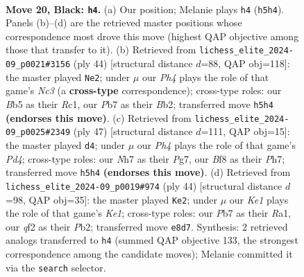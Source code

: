 \documentclass[11pt]{article}
\begin{document}
\begin{figure}[p]
\label{fig:thought-m37}
\end{figure}

\clearpage

\begin{figure}[p]\centering
\begin{subfigure}{0.46\textwidth}\centering
\resizebox{\linewidth}{!}{%
\newchessgame
\chessboard[
  setfen={4kb1r/1p2pp1n/1B1p2p1/1b5p/3PP3/rP2RP2/P4QPP/2K4R b k - 2 20},
  showmover=false,
  pgfstyle=straightmove, color=movearrow, markmove={h5-h4}
]}
\caption{}
\end{subfigure}\hfill
\begin{subfigure}{0.46\textwidth}\centering
\resizebox{\linewidth}{!}{%
\newchessgame
\chessboard[
  setfen={3rrqk1/p5pp/1p2p3/2p1Rp2/2P5/1PN5/PBB2PPP/2R3K1 w - - 0 23},
  showmover=false,
  pgfstyle=straightmove, color=movearrow, markmove={c3-e2}
]}
\caption{}
\end{subfigure}
\\[4pt]
\begin{subfigure}{0.46\textwidth}\centering
\resizebox{\linewidth}{!}{%
\newchessgame
\chessboard[
  setfen={r7/1p2kppp/1p2nb2/2pp4/P7/2P2PB1/1P3RPP/R5K1 b - - 2 24},
  showmover=false,
  pgfstyle=straightmove, color=movearrow, markmove={d5-d4}
]}
\caption{}
\end{subfigure}\hfill
\begin{subfigure}{0.46\textwidth}\centering
\resizebox{\linewidth}{!}{%
\newchessgame
\chessboard[
  setfen={r1b3R1/pp1k1p2/4pq1P/2p5/P2pP3/N2P4/1PPB3p/R3K3 w Q - 2 23},
  showmover=false,
  pgfstyle=straightmove, color=movearrow, markmove={e1-e2}
]}
\caption{}
\end{subfigure}
\caption{\textbf{Move 20, Black: \texttt{h4}.} (a) Our position; Melanie plays \texttt{h4} (\texttt{h5h4}). Panels (b)--(d) are the retrieved master positions whose correspondence most drove this move (highest QAP objective among those that transfer to it). (b) Retrieved from \texttt{lichess\_elite\_2024-09\_p0021\#3156} (ply 44) [structural distance $d$=88, QAP obj=118]: the master played \texttt{Ne2}; under $\mu$ our \emph{Ph4} plays the role of that game's \emph{Nc3} (a \textbf{cross-type} correspondence); cross-type roles: our \emph{B}b5 as their \emph{R}c1, our \emph{P}b7 as their \emph{B}b2; transferred move \texttt{h5h4} \textbf{(endorses this move)}. (c) Retrieved from \texttt{lichess\_elite\_2024-09\_p0025\#2349} (ply 47) [structural distance $d$=111, QAP obj=15]: the master played \texttt{d4}; under $\mu$ our \emph{Ph4} plays the role of that game's \emph{Pd4}; cross-type roles: our \emph{N}h7 as their \emph{P}g7, our \emph{B}f8 as their \emph{P}h7; transferred move \texttt{h5h4} \textbf{(endorses this move)}. (d) Retrieved from \texttt{lichess\_elite\_2024-09\_p0019\#974} (ply 44) [structural distance $d$=98, QAP obj=35]: the master played \texttt{Ke2}; under $\mu$ our \emph{Ke1} plays the role of that game's \emph{Ke1}; cross-type roles: our \emph{P}b7 as their \emph{R}a1, our \emph{q}f2 as their \emph{P}b2; transferred move \texttt{e8d7}. Synthesis: 2 retrieved analogs transferred to \texttt{h4} (summed QAP objective 133, the strongest correspondence among the candidate moves); Melanie committed it via the \texttt{search} selector.}

\end{figure}
\end{document}
